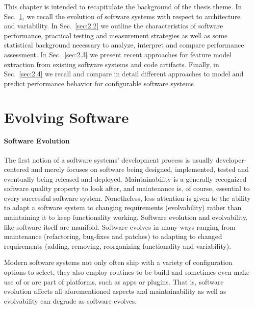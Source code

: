 This chapter is intended to recapitulate the background of the thesis theme. In
Sec.~\ref{sec:2.1}, we recall the evolution of software systems with respect to
architecture and variability. In Sec.~\ref{sec:2.2} we outline the characteristics
of software performance, practical testing and measurement strategies as well as
some statistical background necessary to analyze, interpret and compare
performance assessment. In Sec.~\ref{sec:2.3} we present recent approaches for
feature model extraction from existing software systems and code artifacts. Finally, in
Sec.~\ref{sec:2.4} we recall and compare in detail different approaches to model
and predict performance behavior for configurable software systems.

\section{Evolving Software} \label{sec:2.1}
\paragraph{Software Evolution}
The first notion of a software systems' development process is usually
developer-centered and merely focuses on software being designed, implemented,
tested and eventually being released and deployed. Maintainability is a
generally recognized software quality property to look after, and maintenance
is, of course, essential to every successful software system. Nonetheless, less
attention is given to the ability to adapt a software system to changing
requirements (evolvability) rather than maintaining it to keep functionality
working. Software evolution and evolvability, like software itself are
manifold. Software evolves in many ways ranging from maintenance (refactoring,
bug-fixes and patches) to adapting to changed requirements (adding, removing,
reorganizing functionality and variability).

Modern software systems not only often ship with a variety of configuration
options to select, they also employ routines to be build and sometimes even
make use of or are part of platforms, such as apps or plugins. That is,
software evolution affects all aforementioned aspects and maintainability as
well as evolvability can degrade as software evolves.

